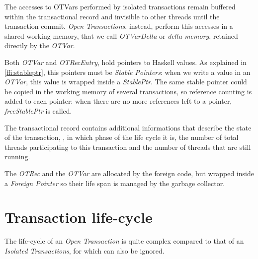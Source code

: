 The accesses to OTVars performed by isolated transactions remain buffered within the transactional record and invisible to other threads until the transaction commit. \emph{Open Transactions}, instead, perform this accesses in a shared working memory, that we call \emph{OTVarDelta} or \emph{delta memory}, retained directly by the \emph{OTVar}.

Both \emph{OTVar} and \emph{OTRecEntry}, hold pointers to Haskell values. 
As explained in \cref{ffi:stableptr}, this pointers must be \emph{Stable Pointers}: when we write a value in an \emph{OTVar}, this value is wrapped inside a \emph{StablePtr}.
The same stable pointer could be copied in the working memory of several transactions, so reference counting is added to each pointer: when there are no more references left to a pointer, \emph{freeStablePtr} is called.

The transactional record contains additional informations that describe the state of the transaction, \ie, in which phase of the life cycle it is, the number of total threads participating to this transaction and the number of threads that are still running.

The \emph{OTRec} and the \emph{OTVar} are allocated by the foreign code, but wrapped inside a \emph{Foreign Pointer} so their life span is managed by the garbage collector.

\section{Transaction life-cycle}

The life-cycle of an \emph{Open Transaction} is quite complex compared to that of an \emph{Isolated Transactions}, for which can also be ignored.


